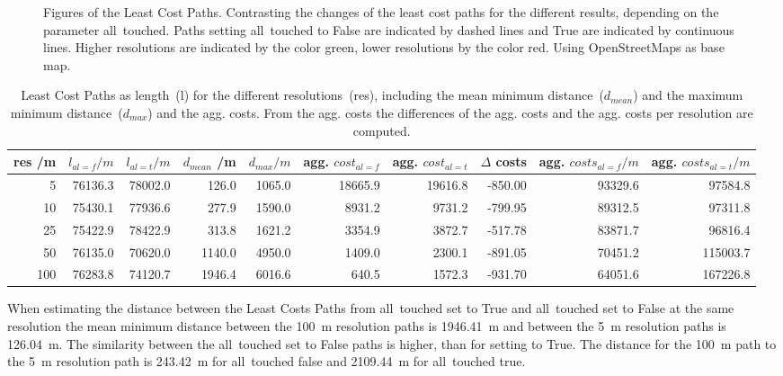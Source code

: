 \begin{figure}
	\centering

	\qquad

	\caption{Figures of the Least Cost Paths. Contrasting the changes of the least cost paths for the different results, depending on the parameter all~touched. Paths setting all~touched to False are indicated by dashed lines and True are indicated by continuous lines. Higher resolutions are indicated by the color green, lower resolutions by the color red. Using OpenStreetMaps as base map.}
	\label{fig:paths_alltouched}
\end{figure}

\begin{table*}[t]
	\caption{Least Cost Paths as length~(l) for the different resolutions~(res), including the mean minimum distance~($d_{mean}$) and the maximum minimum distance~($d_{max}$) and the agg. costs. From the agg. costs the differences of the agg. costs and the agg. costs per resolution are computed.} 
	\label{tab:2}
	\centering
	\begin{tabular}{ r  r  r  r  r  r  r  r  r  r}
		res /m & $l_{al=f} /m$ & $l_{al=t} /m$ & $d_{mean}$ /m & $d_{max}/m$ & agg.  $ cost_{al=f}$ & agg. $ cost_{al=t}$ &  $\Delta $ costs & agg. $costs_{al=f} /m$ & agg. $costs_{al=t} /m$ \\
		\hline
		5 	& 76136.3	& 78002.0 &  126.0 & 1065.0 & 18665.9 & 19616.8 & -850.00 & 93329.6 &  97584.8 \\
		10 	& 75430.1 	& 77936.6 &  277.9 & 1590.0 &  8931.2 &  9731.2 & -799.95 & 89312.5 &  97311.8 \\
		25 	& 75422.9 	& 78422.9 &  313.8 & 1621.2 &  3354.9 &  3872.7 & -517.78 & 83871.7 &  96816.4 \\
		50 	& 76135.0	& 70620.0 & 1140.0 & 4950.0 &  1409.0 &  2300.1 & -891.05 & 70451.2 & 115003.7 \\
		100 & 76283.8	& 74120.7 & 1946.4 & 6016.6 &   640.5 &  1572.3 & -931.70 & 64051.6 & 167226.8 \\

	\end{tabular}
\end{table*}

When estimating the distance between the Least Costs Paths from all~touched set to True and all~touched set to False at the same resolution 
the mean minimum distance between the 100~m resolution paths is 1946.41~m and between the 5~m resolution paths is 126.04~m.
The similarity between the all~touched set to False paths is higher, than for setting to True.
The distance for the 100~m path to the 5~m resolution path is 243.42~m for all~touched false and 2109.44~m for all~touched true.

